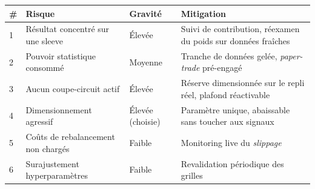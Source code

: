 \begin{center}
\renewcommand{\arraystretch}{1.2}
\small
\begin{tabular}{lllp{4.4cm}}
\toprule
\textbf{\#} & \textbf{Risque} & \textbf{Gravité} & \textbf{Mitigation} \\
\midrule
1 & Résultat concentré sur une sleeve & Élevée & Suivi de contribution, réexamen du poids sur données fraîches \\
2 & Pouvoir statistique consommé & Moyenne & Tranche de données gelée, \emph{paper-trade} pré-engagé \\
3 & Aucun coupe-circuit actif & Élevée & Réserve dimensionnée sur le repli réel, plafond réactivable \\
4 & Dimensionnement agressif & Élevée (choisie) & Paramètre unique, abaissable sans toucher aux signaux \\
5 & Coûts de rebalancement non chargés & Faible & Monitoring live du \emph{slippage} \\
6 & Surajustement hyperparamètres & Faible & Revalidation périodique des grilles \\
\bottomrule
\end{tabular}
\end{center}
